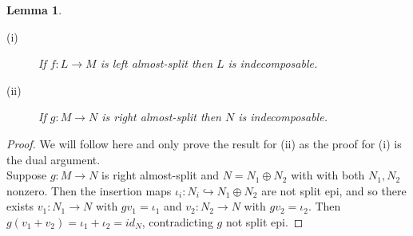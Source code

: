 \documentclass[11.5pt, twoside, a4paper, titlepage]{report}
\theoremstyle{definition}
\theoremstyle{plain}
\newtheorem{lem}[mydef]{Lemma}
\begin{document}
\begin{lem}
\begin{description}
\item [(i)] If $f: L \to M$ is left almost-split then $L$ is indecomposable.
\item [(ii)] If $g: M \to N$ is right almost-split then $N$ is indecomposable.
\end{description}
\end{lem}
\begin{proof}
We will follow \cite{Vale} here and only prove the result for (ii) as the proof for (i) is the dual argument.\\
Suppose $g: M \to N$ is right almost-split and $N=N_1\oplus N_2$ with with both $N_1, N_2$ nonzero. Then the insertion maps $\iota_i: N_i \hookrightarrow N_1 \oplus N_2$ are not split epi, and so there exists $v_1: N_1 \to N$ with $gv_1=\iota_1$ and $v_2: N_2 \to N$ with $gv_2=\iota_2$. Then $g(v_1 + v_2) = \iota_1 + \iota _2 =id_N$, contradicting $g$ not split epi. 
\end{proof}
\end{document}
